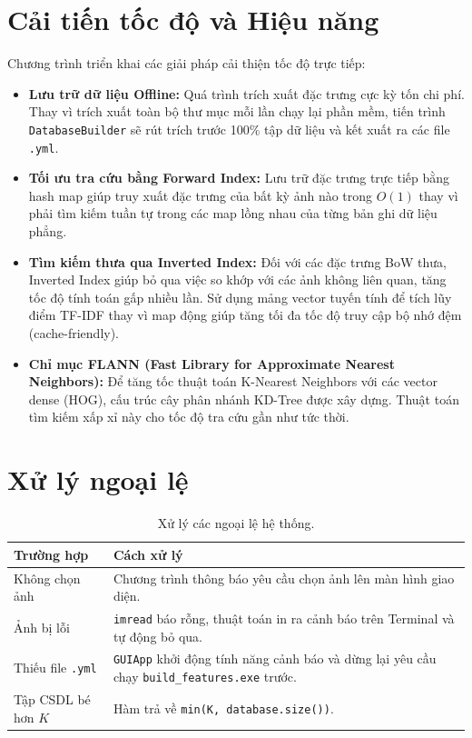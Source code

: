 \section{Cải tiến tốc độ và Hiệu năng}
Chương trình triển khai các giải pháp cải thiện tốc độ trực tiếp:
\begin{itemize}
    \item \textbf{Lưu trữ dữ liệu Offline:} Quá trình trích xuất đặc trưng cực kỳ tốn chi phí. Thay vì trích xuất toàn bộ thư mục mỗi lần chạy lại phần mềm, tiến trình \texttt{DatabaseBuilder} sẽ rút trích trước 100\% tập dữ liệu và kết xuất ra các file \texttt{.yml}.
    \item \textbf{Tối ưu tra cứu bằng Forward Index:} Lưu trữ đặc trưng trực tiếp bằng hash map giúp truy xuất đặc trưng của bất kỳ ảnh nào trong $O(1)$ thay vì phải tìm kiếm tuần tự trong các map lồng nhau của từng bản ghi dữ liệu phẳng.
    \item \textbf{Tìm kiếm thưa qua Inverted Index:} Đối với các đặc trưng BoW thưa, Inverted Index giúp bỏ qua việc so khớp với các ảnh không liên quan, tăng tốc độ tính toán gấp nhiều lần. Sử dụng mảng vector tuyến tính để tích lũy điểm TF-IDF thay vì map động giúp tăng tối đa tốc độ truy cập bộ nhớ đệm (cache-friendly).
    \item \textbf{Chỉ mục FLANN (Fast Library for Approximate Nearest Neighbors):} Để tăng tốc thuật toán K-Nearest Neighbors với các vector dense (HOG), cấu trúc cây phân nhánh KD-Tree được xây dựng. Thuật toán tìm kiếm xấp xỉ này cho tốc độ tra cứu gần như tức thời.
\end{itemize}

\section{Xử lý ngoại lệ}
\begin{table}[H]
\centering
\begin{tabularx}{\textwidth}{|l|X|}
\hline
\textbf{Trường hợp} & \textbf{Cách xử lý} \\
\hline
Không chọn ảnh & Chương trình thông báo yêu cầu chọn ảnh lên màn hình giao diện. \\
\hline
Ảnh bị lỗi & \texttt{imread} báo rỗng, thuật toán in ra cảnh báo trên Terminal và tự động bỏ qua. \\
\hline
Thiếu file \texttt{.yml} & \texttt{GUIApp} khởi động tính năng cảnh báo và dừng lại yêu cầu chạy \texttt{build\_features.exe} trước. \\
\hline
Tập CSDL bé hơn $K$ & Hàm trả về \texttt{min(K, database.size())}. \\
\hline
\end{tabularx}
\caption{Xử lý các ngoại lệ hệ thống.}
\end{table}
